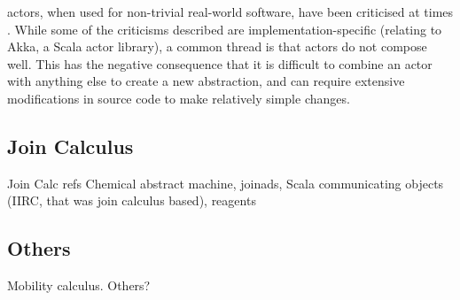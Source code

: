 \Glspl{actor}, when used for non-trivial real-world software, have been criticised at times \cite{Welsh2013,Stucchio2013}.  While some of the criticisms described are implementation-specific (relating to Akka, a Scala \gls{actor} library), a common thread is that \glspl{actor} do not compose well.  This has the negative consequence that it is difficult to combine an \gls{actor} with anything else to create a new abstraction, and can require extensive modifications in source code to make relatively simple changes.

\subsection{Join Calculus}

\begin{anfxwarning}{Join Calc refs}
Chemical abstract machine, joinads, Scala communicating objects (IIRC, that was join calculus based), reagents
\end{anfxwarning}

\subsection{Others}
Mobility calculus.  Others?


